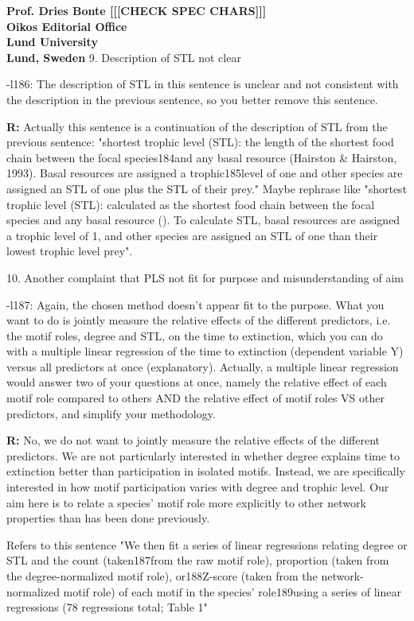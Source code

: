 \documentclass[12pt]{letter}
\begin{document}
\begin{letter}{\bf Prof. Dries Bonte [[[CHECK SPEC CHARS]]]\\
Oikos Editorial Office \\
Lund University \\
Lund, Sweden}
    9. Description of STL not clear

      -l186: The description of STL in this sentence is unclear and not consistent with the description in the previous sentence, so you better remove this sentence.

      \textbf{R:}
      Actually this sentence is a continuation of the description of STL from the previous sentence: "shortest trophic level (STL): the length of the shortest food chain between the focal species184and any basal resource (Hairston & Hairston, 1993). Basal resources are assigned a trophic185level of one and other species are assigned an STL of one plus the STL of their prey." Maybe rephrase like "shortest trophic level (STL): calculated as the shortest food chain between the focal species and any basal resource (). To calculate STL, basal resources are assigned a trophic level of 1, and other species are assigned an STL of one than their lowest trophic level prey".


    10. Another complaint that PLS not fit for purpose and misunderstanding of aim

      -l187: Again, the chosen method doesn’t appear fit to the purpose. What you want to do is jointly measure the relative effects of the different predictors, i.e. the motif roles, degree and STL, on the time to extinction, which you can do with a multiple linear regression of the time to extinction (dependent variable Y) versus all predictors at once (explanatory). Actually, a multiple linear regression would answer two of your questions at once, namely the relative effect of each motif role compared to others AND the relative effect of motif roles VS other predictors, and simplify your methodology.
      
      \textbf{R:} No, we do not want to jointly measure the relative effects of the different predictors. We are not particularly interested in whether degree explains time to extinction better than participation in isolated motifs. Instead, we are specifically interested in how motif participation varies with degree and trophic level. Our aim here is to relate a species' motif role more explicitly to other network properties than has been done previously.

      Refers to this sentence "We then fit a series of linear regressions relating degree or STL and the count (taken187from the raw motif role), proportion (taken from the degree-normalized motif role), or188Z-score (taken from the network-normalized motif role) of each motif in the species’ role189using a series of linear regressions (78 regressions total; Table 1"



\end{letter}
\end{document}
